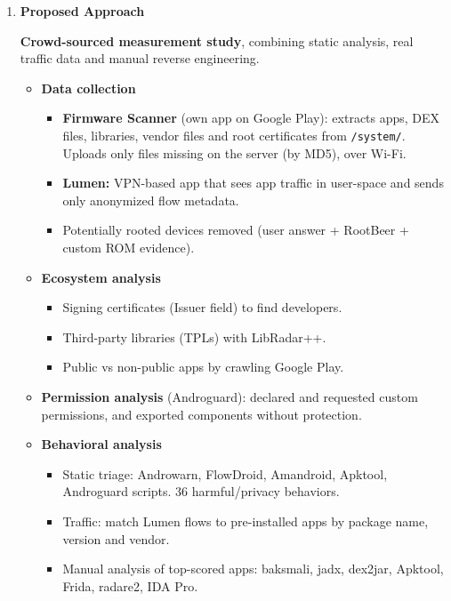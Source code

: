 \documentclass[11pt,a4paper]{article}
\newcommand{\entrypart}[1]{\textbf{\color{accent}#1}\par\vspace{2pt}}
\begin{document}
\begin{enumerate}
    \item \entrypart{Proposed Approach}

    \textbf{Crowd-sourced measurement study}, combining static analysis, real traffic data and manual reverse engineering.

    \begin{itemize}
        \item \textbf{Data collection}
        \begin{itemize}
            \item \textbf{Firmware Scanner} (own app on Google Play): extracts apps, DEX files, libraries, vendor files and root certificates from \texttt{/system/}. Uploads only files missing on the server (by MD5), over Wi-Fi.
            \item \textbf{Lumen:} VPN-based app that sees app traffic in user-space and sends only anonymized flow metadata.
            \item Potentially rooted devices removed (user answer + RootBeer + custom ROM evidence).
        \end{itemize}
        \item \textbf{Ecosystem analysis}
        \begin{itemize}
            \item Signing certificates (Issuer field) to find developers.
            \item Third-party libraries (TPLs) with LibRadar++.
            \item Public vs non-public apps by crawling Google Play.
        \end{itemize}
        \item \textbf{Permission analysis} (Androguard): declared and requested custom permissions, and exported components without protection.
        \item \textbf{Behavioral analysis}
        \begin{itemize}
            \item Static triage: Androwarn, FlowDroid, Amandroid, Apktool, Androguard scripts. 36 harmful/privacy behaviors.
            \item Traffic: match Lumen flows to pre-installed apps by package name, version and vendor.
            \item Manual analysis of top-scored apps: baksmali, jadx, dex2jar, Apktool, Frida, radare2, IDA Pro.
        \end{itemize}
    \end{itemize}


\end{enumerate}
\end{document}
